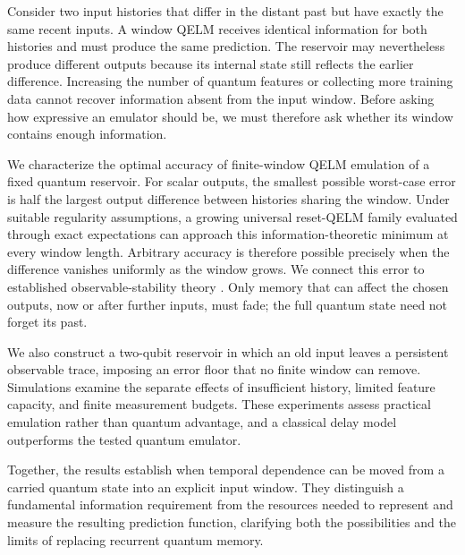 Consider two input histories that differ in the distant past but have
exactly the same recent inputs. A window QELM receives identical information
for both histories and must produce the same prediction. The reservoir may
nevertheless produce different outputs because its internal state still
reflects the earlier difference. Increasing the number of quantum features
or collecting more training data cannot recover information absent from the
input window. Before asking how expressive an emulator should be, we must
therefore ask whether its window contains enough information.



We characterize the optimal accuracy of finite-window QELM emulation of a
fixed quantum reservoir. For scalar outputs, the smallest possible
worst-case error is half the largest output difference between histories
sharing the window. Under suitable regularity assumptions, a growing
universal reset-QELM family evaluated through exact expectations can
approach this information-theoretic minimum at every window length.
Arbitrary accuracy is therefore possible precisely when the difference
vanishes uniformly as the window grows. We connect this error to established
observable-stability theory \cite{petreczky2026stability}.
Only memory that can affect the chosen outputs, now or after further inputs,
must fade; the full quantum state need not forget its past.

We also construct a two-qubit reservoir in which an old input leaves a
persistent observable trace, imposing an error floor that no finite window
can remove. Simulations examine the separate effects of insufficient
history, limited feature capacity, and finite measurement budgets. These
experiments assess practical emulation rather than quantum advantage, and a
classical delay model \cite{gauthier2021next} outperforms the tested quantum
emulator.

Together, the results establish when temporal dependence can be moved from a
carried quantum state into an explicit input window. They distinguish a
fundamental information requirement from the resources needed to represent
and measure the resulting prediction function, clarifying both the
possibilities and the limits of replacing recurrent quantum memory.
